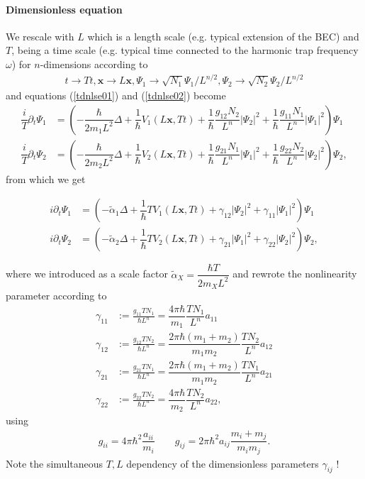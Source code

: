 \documentclass[12pt]{article}
\begin{document}
\paragraph{Dimensionless equation}
We rescale with $L$ which is a length scale (e.g. typical extension of the BEC) and $T$, being a time scale (e.g. typical time connected to the harmonic trap frequency $\omega$) for $n$-dimensions according to
\begin{align}
t \rightarrow Tt, \mathbf{x} \rightarrow L \mathbf{x}, \Psi_1 \rightarrow \sqrt{N_1} \Psi_1 / L^{n/2}, \Psi_2 \rightarrow \sqrt{N_2} \Psi_2 / L^{n/2} \nonumber
\end{align}
and equations (\ref{tdnlse01}) and (\ref{tdnlse02}) become
\begin{align}
\dfrac{i}{T}\partial_t \Psi_1 &= \left( -\dfrac{\hbar}{2m_1L^2} \Delta + \dfrac{1}{\hbar} V_1(L\mathbf{x},Tt) + \dfrac{1}{\hbar} \dfrac{g_{12}N_2}{L^n} \vert\Psi_2\vert^2 + \dfrac{1}{\hbar} \dfrac{g_{11}N_1}{L^n} \vert\Psi_1\vert^2\right)\Psi_1 \nonumber \\
\dfrac{i}{T}\partial_t \Psi_2 &= \left( -\dfrac{\hbar}{2m_2L^2} \Delta + \dfrac{1}{\hbar} V_2(L\mathbf{x},Tt) + \dfrac{1}{\hbar} \dfrac{g_{21}N_1}{L^n} \vert\Psi_1\vert^2 + \dfrac{1}{\hbar} \dfrac{g_{22}N_2}{L^n} \vert\Psi_2\vert^2\right)\Psi_2, \nonumber
\end{align}
from which we get
\begin{center}
\begin{tcolorbox}
\begin{eqnarray}
i\partial_t \Psi_1 &= \left( -\tilde{\alpha}_1 \Delta + \dfrac{1}{\hbar} T V_1(L\mathbf{x},Tt) +  \gamma_{12} \vert\Psi_2\vert^2 + \gamma_{11} \vert\Psi_1\vert^2\right)\Psi_1 \label{tdnlse1} \\
i\partial_t \Psi_2 &= \left( -\tilde{\alpha}_2 \Delta + \dfrac{1}{\hbar} T V_2(L\mathbf{x},Tt) +  \gamma_{21} \vert\Psi_1\vert^2 + \gamma_{22} \vert\Psi_2\vert^2\right)\Psi_2, \label{tdnlse2}
\end{eqnarray}
\end{tcolorbox}
\end{center}
where we introduced as a scale factor $\tilde{\alpha}_X=\dfrac{\hbar T}{2 m_X L^2}$ and rewrote the nonlinearity parameter according to 
\begin{align}
\gamma_{11} &:= \frac{g_{11} T N_1}{\hbar L^n}=\dfrac{4\pi \hbar}{m_1} \dfrac{TN_1}{L^n} a_{11} \\
\gamma_{12} &:= \frac{g_{12} T N_2}{\hbar L^n}=\dfrac{2\pi \hbar (m_1+m_2)}{m_1m_2} \dfrac{TN_2}{L^n} a_{12} \\
\gamma_{21} &:= \frac{g_{21} T N_1}{\hbar L^n}=\dfrac{2\pi \hbar (m_1+m_2)}{m_1m_2} \dfrac{TN_1}{L^n} a_{21} \\
\gamma_{22} &:= \frac{g_{22} T N_2}{\hbar L^n}=\dfrac{4\pi \hbar}{m_2} \dfrac{TN_2}{L^n} a_{22},
\end{align}
using
\begin{eqnarray}
 g_{ii}= 4 \pi \hbar^2 \dfrac{a_{ii}}{m_i} \qquad g_{ij}= 2 \pi \hbar^2 a_{ij}\dfrac{m_i+m_j}{m_i m_j}.
\end{eqnarray}
Note the simultaneous $T,L$ dependency of the dimensionless parameters $\gamma_{ij}$ !  
\end{document}
